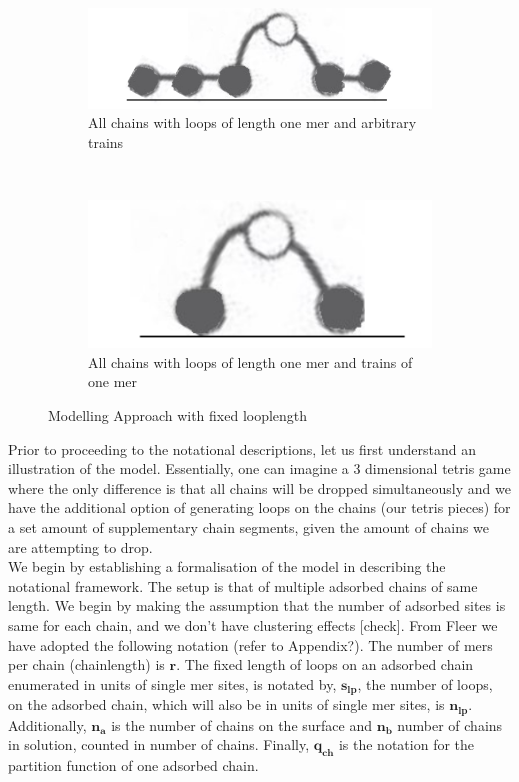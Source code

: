 \documentclass[10pt,letterpaper]{article}
\begin{document}
\begin{figure}[h!]
	\centering
	\begin{subfigure}[b]{0.3\textwidth}
		\centering
		\includegraphics[scale=0.2]{loop1_trains.png}
		\caption{All chains with loops of length one mer and arbitrary trains}
		\label{loop and train}
	\end{subfigure}~~~~~~~~~~~~
	\begin{subfigure}[b]{0.3\textwidth}
		\centering
		\includegraphics[scale=0.2]{loop1.png}
		\caption{All chains with loops of length one mer and trains of one mer}
		\label{loop}
	\end{subfigure}
	\caption{Modelling Approach with fixed looplength}
\end{figure}


\noindent Prior to proceeding to the notational descriptions, let us first understand an illustration of the model. Essentially, one can imagine a 3 dimensional tetris game where the only difference is that all chains will be dropped simultaneously and we have the additional option of generating loops on the chains (our tetris pieces) for a set amount of supplementary chain segments, given the amount of chains we are attempting to drop.\\

\noindent We begin by establishing a formalisation of the model in describing the notational framework. The setup is that of multiple adsorbed chains of same length. We begin by making the assumption that the number of adsorbed sites is same for each chain, and we don't have clustering effects [check]. From Fleer \cite{fleer1993polymers} we have adopted the following notation (refer to Appendix?). The number of mers per chain (chainlength) is $\mathbf{r}$. The fixed length of loops on an adsorbed chain enumerated in units of single mer sites, is notated by, $\mathbf{s_{lp}}$, the number of loops, on the adsorbed chain, which will also be in units of single mer sites, is $\mathbf{n_{lp}}$. Additionally, $\mathbf{n_a}$  is the number of chains on the surface and $\mathbf{n_b}$ number of chains in solution, counted in number of chains. Finally, $\mathbf{q_{ch}}$ is the notation for the partition function of one adsorbed chain.\\
\end{document}
